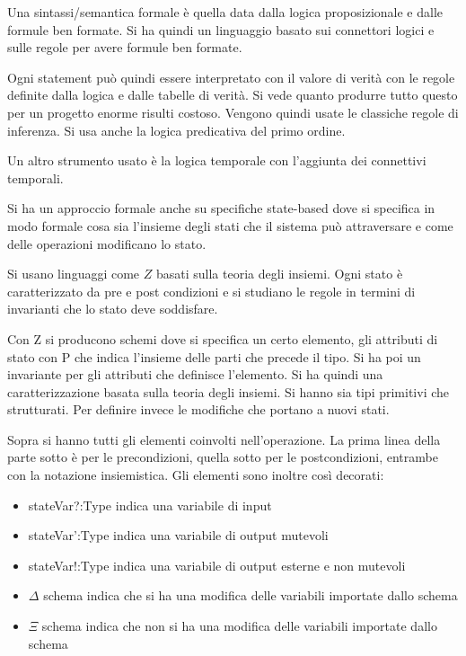 Una sintassi/semantica formale è quella data dalla logica proposizionale e dalle
formule ben formate. Si ha quindi un linguaggio basato sui connettori logici e
sulle regole per avere formule ben formate.

Ogni statement può quindi essere interpretato con il valore di verità con le
regole definite dalla logica e dalle tabelle di verità. Si vede quanto produrre
tutto questo per un progetto enorme risulti costoso. Vengono quindi usate le
classiche regole di inferenza. Si usa anche la logica predicativa del primo ordine.

Un altro strumento usato è la logica temporale con l'aggiunta dei connettivi temporali.

Si ha un approccio formale anche su specifiche state-based dove si specifica in
modo formale cosa sia l'insieme degli stati che il sistema può attraversare e
come delle operazioni modificano lo stato.

Si usano linguaggi come $Z$ basati sulla teoria degli insiemi. Ogni stato è
caratterizzato da pre e post condizioni e si studiano le regole in termini di
invarianti che lo stato deve soddisfare.

Con Z si producono schemi dove si specifica un certo elemento, gli attributi di
stato con P che indica l'insieme delle parti che precede il tipo. Si ha poi un
invariante per gli attributi che definisce l'elemento. Si ha quindi una caratterizzazione
basata sulla teoria degli insiemi. Si hanno sia tipi primitivi che strutturati.
Per definire invece le modifiche che portano a nuovi stati.

Sopra si hanno tutti gli elementi coinvolti nell'operazione. La prima linea della
parte sotto è per le precondizioni, quella sotto per le postcondizioni, entrambe
con la notazione insiemistica. Gli elementi sono inoltre così decorati:
\begin{itemize}
    \item stateVar?:Type indica una variabile di input
    \item stateVar':Type indica una variabile di output mutevoli
    \item stateVar!:Type indica una variabile di output esterne e non mutevoli
    \item $\Delta$ schema indica che si ha una modifica delle variabili importate
          dallo schema
    \item $\Xi$ schema indica che non si ha una modifica delle variabili importate
          dallo schema
\end{itemize}

